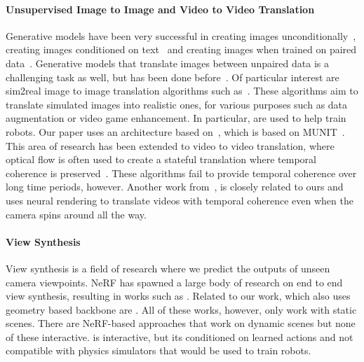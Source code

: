 \documentclass{article}
\begin{document}
\paragraph{Unsupervised Image to Image and Video to Video Translation}
Generative models have been very successful in creating images unconditionally~\cite{gan,stylegan}, creating images conditioned on text~\cite{dalle,imagen} and creating images when trained on paired data~\cite{pixtopix}.
Generative models that translate images between unpaired data is a challenging task as well, but has been done before~\cite{dual_diffusion,cyclegan,munit,unit}.
Of particular interest are sim2real image to image translation algorithms such as~\cite{retina_gan,rl_cyclegan,surgical_image_translation,enhancing_photorealism_enhancement}. These algorithms aim to translate simulated images into realistic ones, for various purposes such as data augmentation or video game enhancement. In particular, \citet{retina_gan,rl_cyclegan} are used to help train robots. Our paper uses an architecture based on~\citet{surgical_image_translation}, which is based on MUNIT~\cite{munit}.
This area of research has been extended to video to video translation, where optical flow is often used to create a stateful translation where temporal coherence is preserved~\cite{tecogan,mocyclegan}. These algorithms fail to provide temporal coherence over long time periods, however. Another work from~\citet{surgical_video_translation}, is closely related to ours and uses neural rendering to translate videos with temporal coherence even when the camera spins around all the way.

\vspace{-8pt}
\paragraph{View Synthesis}
View synthesis is a field of research where we predict the outputs of unseen camera viewpoints. NeRF \cite{nerf} has spawned a large body of research on end to end view synthesis, resulting in works such as \cite{nerv,fast_nerf,barf}. Related to our work, which also uses geometry based backbone are \cite{free_view_synthesis,stable_view_synthesis,ners}. All of these works, however, only work with static scenes. There are NeRF-based approaches that work on dynamic scenes \cite{dnerf,nerfies,nerualradianceflow} but none of these interactive. \citet{playable_environments} is interactive, but its conditioned on learned actions and not compatible with physics simulators that would be used to train robots.
\end{document}
